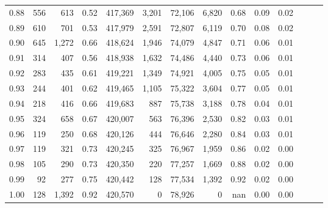 \begin{tabular}{rrrrrrrrrrrrrr}
0.88 &     556 &    613 &  0.52 &  417,369 &    3,201 &  72,106 &   6,820 &  0.68 &  0.09 &      0.02 \\
0.89 &     610 &    701 &  0.53 &  417,979 &    2,591 &  72,807 &   6,119 &  0.70 &  0.08 &      0.02 \\
0.90 &     645 &  1,272 &  0.66 &  418,624 &    1,946 &  74,079 &   4,847 &  0.71 &  0.06 &      0.01 \\
0.91 &     314 &    407 &  0.56 &  418,938 &    1,632 &  74,486 &   4,440 &  0.73 &  0.06 &      0.01 \\
0.92 &     283 &    435 &  0.61 &  419,221 &    1,349 &  74,921 &   4,005 &  0.75 &  0.05 &      0.01 \\
0.93 &     244 &    401 &  0.62 &  419,465 &    1,105 &  75,322 &   3,604 &  0.77 &  0.05 &      0.01 \\
0.94 &     218 &    416 &  0.66 &  419,683 &      887 &  75,738 &   3,188 &  0.78 &  0.04 &      0.01 \\
0.95 &     324 &    658 &  0.67 &  420,007 &      563 &  76,396 &   2,530 &  0.82 &  0.03 &      0.01 \\
0.96 &     119 &    250 &  0.68 &  420,126 &      444 &  76,646 &   2,280 &  0.84 &  0.03 &      0.01 \\
0.97 &     119 &    321 &  0.73 &  420,245 &      325 &  76,967 &   1,959 &  0.86 &  0.02 &      0.00 \\
0.98 &     105 &    290 &  0.73 &  420,350 &      220 &  77,257 &   1,669 &  0.88 &  0.02 &      0.00 \\
0.99 &      92 &    277 &  0.75 &  420,442 &      128 &  77,534 &   1,392 &  0.92 &  0.02 &      0.00 \\
1.00 &     128 &  1,392 &  0.92 &  420,570 &        0 &  78,926 &       0 &   nan &  0.00 &      0.00 \\
\bottomrule
\end{tabular}
